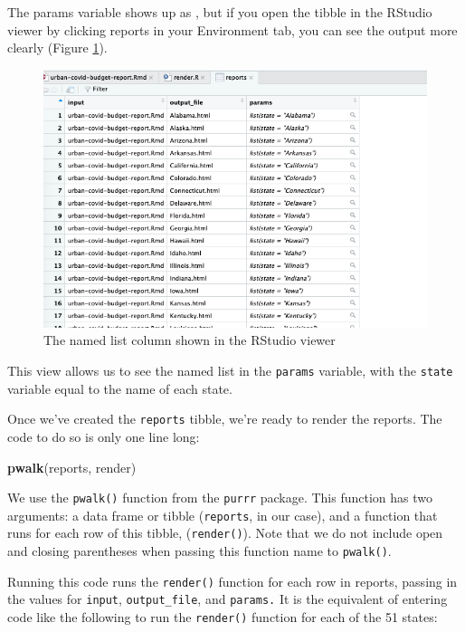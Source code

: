 \documentclass[
]{book}
\newenvironment{Shaded}{\begin{snugshade}}{\end{snugshade}}
\newcommand{\FunctionTok}[1]{\textcolor[rgb]{0.13,0.29,0.53}{\textbf{#1}}}
\newcommand{\NormalTok}[1]{#1}
\begin{document}
The params variable shows up as , but if you open the tibble in the RStudio viewer by clicking reports in your Environment tab, you can see the output more clearly (Figure \ref{fig:params-named-list}).

\begin{figure}
\includegraphics[width=1\linewidth]{assets/params-named-list} \caption{The named list column shown in the RStudio viewer}\label{fig:params-named-list}
\end{figure}

This view allows us to see the named list in the \texttt{params} variable, with the \texttt{state} variable equal to the name of each state.

Once we've created the \texttt{reports} tibble, we're ready to render the reports. The code to do so is only one line long:

\begin{Shaded}
\begin{Highlighting}[]
\FunctionTok{pwalk}\NormalTok{(reports, render)}
\end{Highlighting}
\end{Shaded}

We use the \texttt{pwalk()} function from the \texttt{purrr} package. This function has two arguments: a data frame or tibble (\texttt{reports}, in our case), and a function that runs for each row of this tibble, (\texttt{render()}). Note that we do not include open and closing parentheses when passing this function name to \texttt{pwalk()}.

Running this code runs the \texttt{render()} function for each row in reports, passing in the values for \texttt{input}, \texttt{output\_file}, and \texttt{params.} It is the equivalent of entering code like the following to run the \texttt{render()} function for each of the 51 states:
\end{document}
